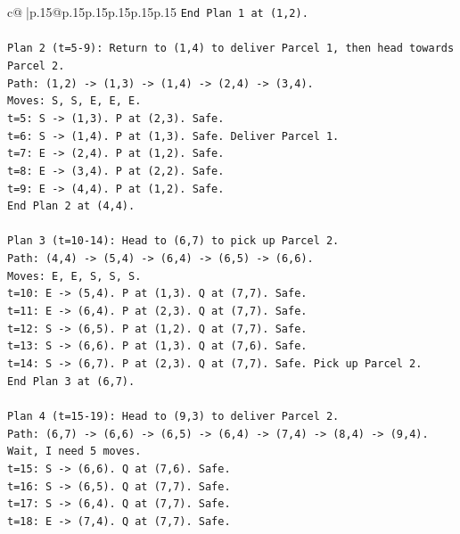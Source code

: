 \documentclass{article}
\begin{document}
{\begin{supertabular}{c@{$\;$}|p{.15\linewidth}@{}p{.15\linewidth}p{.15\linewidth}p{.15\linewidth}p{.15\linewidth}p{.15\linewidth}}
{{{\texttt{End Plan 1 at (1,2).} \\
\\ 
\texttt{Plan 2 (t=5{-}9): Return to (1,4) to deliver Parcel 1, then head towards Parcel 2.} \\
\texttt{Path: (1,2) {-}> (1,3) {-}> (1,4) {-}> (2,4) {-}> (3,4).} \\
\texttt{Moves: S, S, E, E, E.} \\
\texttt{t=5: S {-}> (1,3). P at (2,3). Safe.} \\
\texttt{t=6: S {-}> (1,4). P at (1,3). Safe. Deliver Parcel 1.} \\
\texttt{t=7: E {-}> (2,4). P at (1,2). Safe.} \\
\texttt{t=8: E {-}> (3,4). P at (2,2). Safe.} \\
\texttt{t=9: E {-}> (4,4). P at (1,2). Safe.} \\
\texttt{End Plan 2 at (4,4).} \\
\\ 
\texttt{Plan 3 (t=10{-}14): Head to (6,7) to pick up Parcel 2.} \\
\texttt{Path: (4,4) {-}> (5,4) {-}> (6,4) {-}> (6,5) {-}> (6,6).} \\
\texttt{Moves: E, E, S, S, S.} \\
\texttt{t=10: E {-}> (5,4). P at (1,3). Q at (7,7). Safe.} \\
\texttt{t=11: E {-}> (6,4). P at (2,3). Q at (7,7). Safe.} \\
\texttt{t=12: S {-}> (6,5). P at (1,2). Q at (7,7). Safe.} \\
\texttt{t=13: S {-}> (6,6). P at (1,3). Q at (7,6). Safe.} \\
\texttt{t=14: S {-}> (6,7). P at (2,3). Q at (7,7). Safe. Pick up Parcel 2.} \\
\texttt{End Plan 3 at (6,7).} \\
\\ 
\texttt{Plan 4 (t=15{-}19): Head to (9,3) to deliver Parcel 2.} \\
\texttt{Path: (6,7) {-}> (6,6) {-}> (6,5) {-}> (6,4) {-}> (7,4) {-}> (8,4) {-}> (9,4).} \\
\texttt{Wait, I need 5 moves.} \\
\texttt{t=15: S {-}> (6,6). Q at (7,6). Safe.} \\
\texttt{t=16: S {-}> (6,5). Q at (7,7). Safe.} \\
\texttt{t=17: S {-}> (6,4). Q at (7,7). Safe.} \\
\texttt{t=18: E {-}> (7,4). Q at (7,7). Safe.} \\
}}}
\end{supertabular}}
\end{document}
